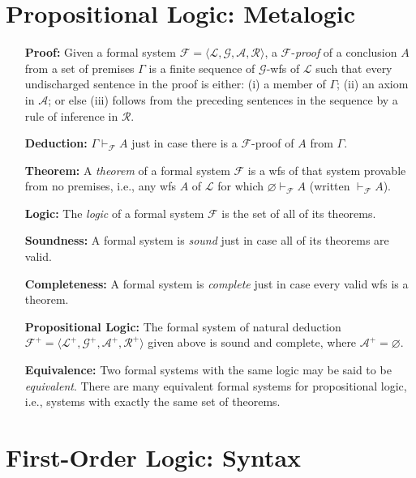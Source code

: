 \documentclass[a4paper, 11pt]{article} %
\newcommand{\tuple}[1]{\langle#1\rangle} %
\begin{document}
\section*{\sc Propositional Logic: Metalogic}

\begin{enumerate}[leftmargin=1.2in,labelsep=.15in] 
\item[\bf Proof:] Given a formal system $\mathcal{F}=\tuple{\mathcal{L},\mathcal{G},\mathcal{A},\mathcal{R}}$, a $\mathcal{F}$-\textit{proof} of a conclusion $A$ from a set of premises $\Gamma$ is a finite sequence of $\mathcal{G}$-wfs of $\mathcal{L}$ such that every undischarged sentence in the proof is either: (i) a member of $\Gamma$; (ii) an axiom in $\mathcal{A}$; or else (iii) follows from the preceding sentences in the sequence by a rule of inference in $\mathcal{R}$.
\item[\bf Deduction:] $\Gamma\vdash_{\mathcal{F}} A$ just in case there is a $\mathcal{F}$-proof of $A$ from $\Gamma$.
\item[\bf Theorem:] A \textit{theorem} of a formal system $\mathcal{F}$ is a wfs of that system provable from no premises, i.e., any wfs $A$ of $\mathcal{L}$ for which $\varnothing\vdash_{\mathcal{F}}A$ (written $\vdash_{\mathcal{F}}A$).
\item[\bf Logic:] The \textit{logic} of a formal system $\mathcal{F}$ is the set of all of its theorems.
\item[\bf Soundness:] A formal system is \textit{sound} just in case all of its theorems are valid.
\item[\bf Completeness:] A formal system is \textit{complete} just in case every valid wfs is a theorem.
\item[\bf Propositional Logic:] The formal system of natural deduction $\mathcal{F}^+=\tuple{\mathcal{L}^+,\mathcal{G}^+,\mathcal{A}^+,\mathcal{R}^+}$ given above is sound and complete, where $\mathcal{A}^+=\varnothing$. 
\item[\bf Equivalence:] Two formal systems with the same logic may be said to be \textit{equivalent}. There are many equivalent formal systems for propositional logic, i.e., systems with exactly the same set of theorems.
\end{enumerate}




\section*{\sc First-Order Logic: Syntax}
\end{document}
